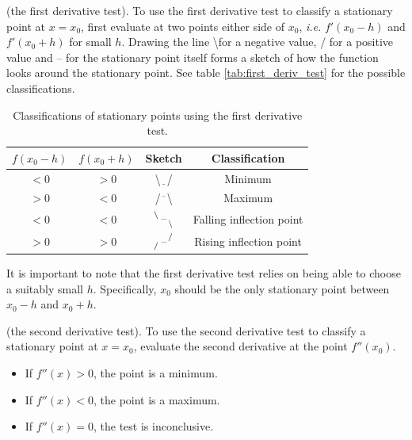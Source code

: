 \begin{definition}
    (the first derivative test). To use the first derivative test to classify a stationary point at $x=x_0$, first evaluate at two points either side of $x_0$, \emph{i.e.} $f'(x_0-h)$ and $f'(x_0+h)$ for small $h$. Drawing the line \textbackslash for a negative value, / for a positive value and -- for the stationary point itself forms a sketch of how the function looks around the stationary point. See table \ref{tab:first_deriv_test} for the possible classifications.
\end{definition}

\renewcommand{\arraystretch}{2.0}
\begin{table}[h]
    \centering
    \begin{tabular}{|c|c|c|c|}\hline
    $f(x_0-h)$ & $f(x_0+h)$ & Sketch & Classification \\ \hline 
    $<0$  & $>0$ & \textbackslash$\underline{\phantom{x}}$/ & Minimum \\ \hline
    $>0$  & $<0$ & /$\overline{\phantom{x}}$\textbackslash & Maximum \\ \hline
    $<0$  & $<0$ & $\backslash \atop \phantom{x}$--$\phantom{x} \atop \backslash$ & Falling inflection point \\ \hline
    $>0$  & $>0$ & $\phantom{x} \atop /$--$/ \atop \phantom{x}$ & Rising inflection point \\ \hline
    \end{tabular}
    \caption{Classifications of stationary points using the first derivative test.}
    \label{tab:placeholder}
\end{table}

It is important to note that the first derivative test relies on being able to choose a suitably small $h$. Specifically, $x_0$ should be the only stationary point between $x_0-h$ and $x_0 + h$.

\begin{definition}
    (the second derivative test). To use the second derivative test to classify a stationary point at $x=x_0$, evaluate the second derivative at the point $f''(x_0)$.
    \begin{itemize}
        \item If $f''(x) > 0$, the point is a minimum.
        \item If $f''(x) < 0$, the point is a maximum.
        \item If $f''(x) = 0$, the test is inconclusive.
    \end{itemize}
\end{definition}

